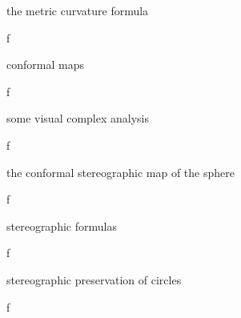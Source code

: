 \documentclass{article}
\newenvironment{andrew_section}[1]
    {
    \section{#1}
    \begin{itemize}
    }
    {
    \end{itemize}
    }
\begin{document}
\begin{andrew_section}{the metric curvature formula}
    \item f
\end{andrew_section}

\begin{andrew_section}{conformal maps}
    \item f
\end{andrew_section}

\begin{andrew_section}{some visual complex analysis}
    \item f
\end{andrew_section}

\begin{andrew_section}{the conformal stereographic map of the sphere}
    \item f
\end{andrew_section}

\begin{andrew_section}{stereographic formulas}
    \item f
\end{andrew_section}

\begin{andrew_section}{stereographic preservation of circles}
    \item f
\end{andrew_section}
\end{document}
